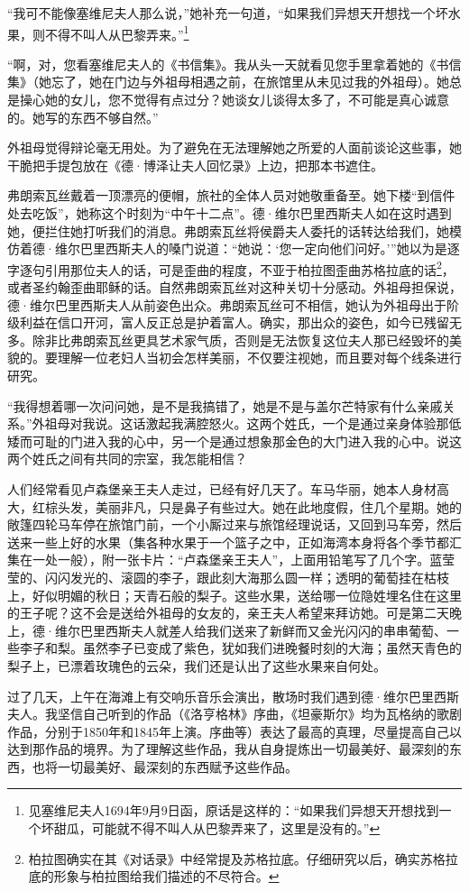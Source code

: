 \par “我可不能像塞维尼夫人那么说，”她补充一句道，“如果我们异想天开想找一个坏水果，则不得不叫人从巴黎弄来。”\footnote{见塞维尼夫人1694年9月9日函，原话是这样的：“如果我们异想天开想找到一个坏甜瓜，可能就不得不叫人从巴黎弄来了，这里是没有的。”}
\par “啊，对，您看塞维尼夫人的《书信集》。我从头一天就看见您手里拿着她的《书信集》（她忘了，她在门边与外祖母相遇之前，在旅馆里从未见过我的外祖母）。她总是操心她的女儿，您不觉得有点过分？她谈女儿谈得太多了，不可能是真心诚意的。她写的东西不够自然。”
\par 外祖母觉得辩论毫无用处。为了避免在无法理解她之所爱的人面前谈论这些事，她干脆把手提包放在《德·博泽让夫人回忆录》上边，把那本书遮住。
\par 弗朗索瓦丝戴着一顶漂亮的便帽，旅社的全体人员对她敬重备至。她下楼“到信件处去吃饭”，她称这个时刻为“中午十二点”。德·维尔巴里西斯夫人如在这时遇到她，便拦住她打听我们的消息。弗朗索瓦丝将侯爵夫人委托的话转达给我们，她模仿着德·维尔巴里西斯夫人的嗓门说道：“她说：‘您一定向他们问好。’”她以为是逐字逐句引用那位夫人的话，可是歪曲的程度，不亚于柏拉图歪曲苏格拉底的话\footnote{柏拉图确实在其《对话录》中经常提及苏格拉底。仔细研究以后，确实苏格拉底的形象与柏拉图给我们描述的不尽符合。}，或者圣约翰歪曲耶稣的话。自然弗朗索瓦丝对这种关切十分感动。外祖母担保说，德·维尔巴里西斯夫人从前姿色出众。弗朗索瓦丝可不相信，她认为外祖母出于阶级利益在信口开河，富人反正总是护着富人。确实，那出众的姿色，如今已残留无多。除非比弗朗索瓦丝更具艺术家气质，否则是无法恢复这位夫人那已经毁坏的美貌的。要理解一位老妇人当初会怎样美丽，不仅要注视她，而且要对每个线条进行研究。
\par “我得想着哪一次问问她，是不是我搞错了，她是不是与盖尔芒特家有什么亲戚关系。”外祖母对我说。这话激起我满腔怒火。这两个姓氏，一个是通过亲身体验那低矮而可耻的门进入我的心中，另一个是通过想象那金色的大门进入我的心中。说这两个姓氏之间有共同的宗室，我怎能相信？
\par 人们经常看见卢森堡亲王夫人走过，已经有好几天了。车马华丽，她本人身材高大，红棕头发，美丽非凡，只是鼻子有些过大。她在此地度假，住几个星期。她的敞篷四轮马车停在旅馆门前，一个小厮过来与旅馆经理说话，又回到马车旁，然后送来一些上好的水果（集各种水果于一个篮子之中，正如海湾本身将各个季节都汇集在一处一般），附一张卡片：“卢森堡亲王夫人”，上面用铅笔写了几个字。蓝莹莹的、闪闪发光的、滚圆的李子，跟此刻大海那么圆一样；透明的葡萄挂在枯枝上，好似明媚的秋日；天青石般的梨子。这些水果，送给哪一位隐姓埋名住在这里的王子呢？这不会是送给外祖母的女友的，亲王夫人希望来拜访她。可是第二天晚上，德·维尔巴里西斯夫人就差人给我们送来了新鲜而又金光闪闪的串串葡萄、一些李子和梨。虽然李子已变成了紫色，犹如我们进晚餐时刻的大海；虽然天青色的梨子上，已漂着玫瑰色的云朵，我们还是认出了这些水果来自何处。
\par 过了几天，上午在海滩上有交响乐音乐会演出，散场时我们遇到德·维尔巴里西斯夫人。我坚信自己听到的作品（《洛亨格林》序曲，《坦豪斯尔》均为瓦格纳的歌剧作品，分别于1850年和1845年上演。序曲等）表达了最高的真理，尽量提高自己以达到那作品的境界。为了理解这些作品，我从自身提炼出一切最美好、最深刻的东西，也将一切最美好、最深刻的东西赋予这些作品。



